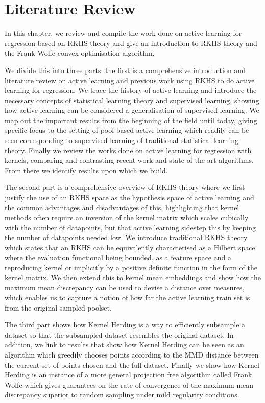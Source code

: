 \chapter{Literature Review}
\label{ch:lit-rev}

In this chapter, we review and compile the work done on active learning for
regression based on RKHS theory and give an introduction to RKHS theory and the
Frank Wolfe convex optimisation algorithm.

We divide this into three parts: the first is a comprehensive introduction and
literature review on active learning and previous work using RKHS to do active
learning for regression. We trace the history of active learning and introduce
the necessary concepts of statistical learning theory and supervised learning,
showing how active learning can be considered a generalisation of supervised
learning. We map out the important results from the beginning of the field until
today, giving specific focus to the setting of pool-based active learning which
readily can be seen corresponding to supervised learning of traditional
statistical learning theory. Finally we review the works done on active learning
for regression with kernels, comparing and contrasting recent work and state of
the art algorithms. From there we identify results upon which we build.

The second part is a comprehensive overview of RKHS theory where we first
justify the use of an RKHS space as the hypothesis space of active learning and
the common advantages and disadvantages of this, highlighting that kernel
methods often require an inversion of the kernel matrix which scales cubically
with the number of datapoints, but that active learning sidestep this by keeping
the number of datapoints needed low. We introduce traditional RKHS theory which
states that an RKHS can be equivalently characterised as a Hilbert space where
the evaluation functional being bounded, as a feature space and a reproducing
kernel or implicitly by a positive definite function in the form of the kernel
matrix. We then extend this to kernel mean embeddings and show how the maximum
mean discrepancy can be used to devise a distance over measures, which enables
us to capture a notion of how far the active learning train set is from the
original sampled poolset.

The third part shows how Kernel Herding is a way to efficiently subsample a
dataset so that the subsampled dataset resembles the original dataset. In
addition, we link to results that show how Kernel Herding can be seen as an
algorithm which greedily chooses points according to the MMD distance between
the current set of points chosen and the full dataset. Finally we show how
Kernel Herding is an instance of a more general projection free algorithm called
Frank Wolfe which gives guarantees on the rate of convergence of the maximum
mean discrepancy superior to random sampling under mild regularity conditions.

